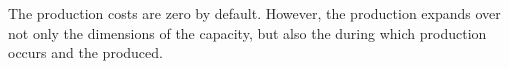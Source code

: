 \documentclass[letterpaper,10pt,english]{sphinxmanual}
\begin{document}
\begin{fulllineitems}
The production costs are zero by default. However, the production expands over
not only the dimensions of the capacity, but also the  during
which production occurs and the  produced.

\begin{sphinxVerbatim}[commandchars=\\\{\}]
\end{sphinxVerbatim}

\end{fulllineitems}

\end{document}
